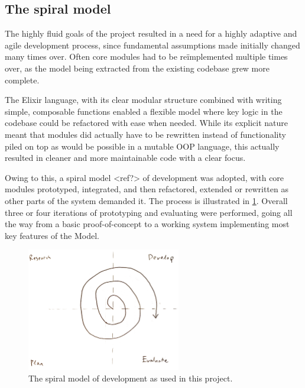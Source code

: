 \subsection{The spiral model}

The highly fluid goals of the project resulted in a need for a highly adaptive and agile development process, since fundamental assumptions made initially changed many times over.
Often core modules had to be re\"implemented multiple times over, as the model being extracted from the existing codebase grew more complete.

The Elixir language, with its clear modular structure combined with writing simple, composable functions enabled a flexible model where key logic in the codebase could be refactored with ease when needed.
While its explicit nature meant that modules did actually have to be rewritten instead of functionality piled on top as would be possible in a mutable OOP language, this actually resulted in cleaner and more maintainable code with a clear focus.

Owing to this, a spiral model <ref?> of development was adopted, with core modules prototyped, integrated, and then refactored, extended or rewritten as other parts of the system demanded it.
The process is illustrated in \cref{fig:prep:spiral-model}.
Overall three or four iterations of prototyping and evaluating were performed, going all the way from a basic proof-of-concept to a working system implementing most key features of the Model.

\begin{figure}[h]
	\centering
	\includegraphics[width=0.6\textwidth]{images/temp/spiral}
	\caption{The spiral model of development as used in this project.}
	\label{fig:prep:spiral-model}
\end{figure}



